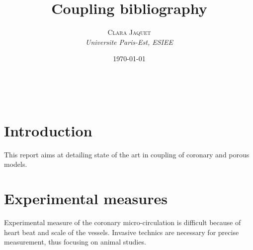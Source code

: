 \documentclass[a4paper, 11pt]{article} %
\title{\textbf{Coupling bibliography}} %
\author{\textsc{Clara Jaquet} %
\\{\textit{Universite Paris-Est, ESIEE}}} %
\date{\today} %
\makeatletter
\renewcommand{\maketitle}{ %
\begin{flushright} %
{\LARGE\@title} %

\vspace{50pt} %

{\large\@author} %
\\\@date %

\vspace{40pt} %
\end{flushright}
}
\makeatother
\begin{document}
\maketitle %





\vspace{30pt} %


\section*{Introduction}

This report aims at detailing state of the art in coupling of coronary and porous models.



\section*{Experimental measures}
Experimental measure of the coronary micro-circulation is difficult because of heart beat and scale of the vessels. Invasive technics are necessary for precise measurement, thus focusing on animal studies.
\end{document}
